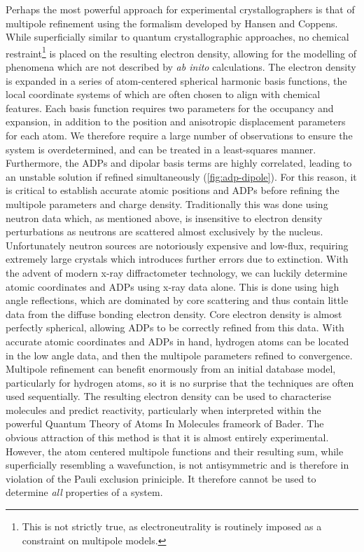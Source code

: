 \begin{refsection}
Perhaps the most powerful approach for experimental crystallographers is that of multipole refinement using the formalism developed by Hansen and Coppens.\autocite{Hansen1978}
While superficially similar to quantum crystallographic approaches, no chemical restraint\footnote{This is not strictly true, as electroneutrality is routinely imposed as a constraint on multipole models.} is placed on the resulting electron density, allowing for the modelling of phenomena which are not described by \emph{ab inito} calculations.
The electron density is expanded in a series of atom-centered spherical harmonic basis functions, the local coordinate systems of which are often chosen to align with chemical features.
Each basis function requires two parameters for the occupancy and expansion, in addition to the position and anisotropic displacement parameters for each atom.
We therefore require a large number of observations to ensure the system is overdetermined, and can be treated in a least-squares manner.
Furthermore, the ADPs and dipolar basis terms are highly correlated, leading to an unstable solution if refined simultaneously (\cref{fig:adp-dipole}).
For this reason, it is critical to establish accurate atomic positions and ADPs before refining the multipole parameters and charge density.
Traditionally this was done using neutron data which, as mentioned above, is insensitive to electron density perturbations as neutrons are scattered almost exclusively by the nucleus.
Unfortunately neutron sources are notoriously expensive and low-flux, requiring extremely large crystals which introduces further errors due to extinction.
With the advent of modern x-ray diffractometer technology, we can luckily determine atomic coordinates and ADPs using x-ray data alone.
This is done using high angle reflections, which are dominated by core scattering and thus contain little data from the diffuse bonding electron density.
Core electron density is almost perfectly spherical, allowing ADPs to be correctly refined from this data.
With accurate atomic coordinates and ADPs in hand, hydrogen atoms can be located in the low angle data, and then the multipole parameters refined to convergence.
Multipole refinement can benefit enormously from an initial database model, particularly for hydrogen atoms, so it is no surprise that the techniques are often used sequentially.\autocite{Guillot2001,Volkov2006}
The resulting electron density can be used to characterise molecules and predict reactivity, particularly when interpreted within the powerful Quantum Theory of Atoms In Molecules frameork of Bader.\autocite{Bader1991}
The obvious attraction of this method is that it is almost entirely experimental.
However, the atom centered multipole functions and their resulting sum, while superficially resembling a wavefunction, is not antisymmetric and is therefore in violation of the Pauli exclusion priniciple.
It therefore cannot be used to determine \emph{all} properties of a system.


\end{refsection}
